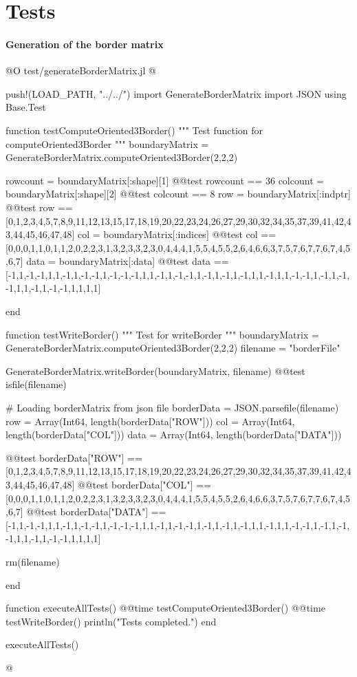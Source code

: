 \documentclass[11pt,oneside]{article}	%
\begin{document}

\section{Tests}\label{sec:tests}

\paragraph{Generation of the border matrix}
@O test/generateBorderMatrix.jl
@{push!(LOAD_PATH, "../../")
import GenerateBorderMatrix
import JSON
using Base.Test

function testComputeOriented3Border()
  """
  Test function for computeOriented3Border
  """
  boundaryMatrix = GenerateBorderMatrix.computeOriented3Border(2,2,2)

  rowcount = boundaryMatrix[:shape][1]
  @@test rowcount == 36
  colcount = boundaryMatrix[:shape][2]
  @@test colcount == 8
  row = boundaryMatrix[:indptr]
  @@test row == [0,1,2,3,4,5,7,8,9,11,12,13,15,17,18,19,20,22,23,24,26,27,29,30,32,34,35,37,39,41,42,43,44,45,46,47,48]
  col = boundaryMatrix[:indices]
  @@test col == [0,0,0,1,1,0,1,1,2,0,2,2,3,1,3,2,3,3,2,3,0,4,4,4,1,5,5,4,5,5,2,6,4,6,6,3,7,5,7,6,7,7,6,7,4,5,6,7]
  data = boundaryMatrix[:data]
  @@test data == [-1,1,-1,-1,1,1,-1,1,-1,-1,1,-1,-1,-1,1,1,-1,1,-1,-1,1,-1,1,-1,1,-1,1,1,-1,1,1,-1,-1,1,-1,1,-1,-1,1,1,-1,1,-1,-1,1,1,1,1]

end

function testWriteBorder()
  """
  Test for writeBorder
  """
  boundaryMatrix = GenerateBorderMatrix.computeOriented3Border(2,2,2)
  filename = "borderFile"

  GenerateBorderMatrix.writeBorder(boundaryMatrix, filename)
  @@test isfile(filename)

  # Loading borderMatrix from json file
  borderData = JSON.parsefile(filename)
  row = Array(Int64, length(borderData["ROW"]))
  col = Array(Int64, length(borderData["COL"]))
  data = Array(Int64, length(borderData["DATA"]))

  @@test borderData["ROW"] == [0,1,2,3,4,5,7,8,9,11,12,13,15,17,18,19,20,22,23,24,26,27,29,30,32,34,35,37,39,41,42,43,44,45,46,47,48]
  @@test borderData["COL"] == [0,0,0,1,1,0,1,1,2,0,2,2,3,1,3,2,3,3,2,3,0,4,4,4,1,5,5,4,5,5,2,6,4,6,6,3,7,5,7,6,7,7,6,7,4,5,6,7]
  @@test borderData["DATA"] == [-1,1,-1,-1,1,1,-1,1,-1,-1,1,-1,-1,-1,1,1,-1,1,-1,-1,1,-1,1,-1,1,-1,1,1,-1,1,1,-1,-1,1,-1,1,-1,-1,1,1,-1,1,-1,-1,1,1,1,1]

  rm(filename)

end

function executeAllTests()
  @@time testComputeOriented3Border()
  @@time testWriteBorder()
  println("Tests completed.")
end

executeAllTests()

@}
\end{document}
